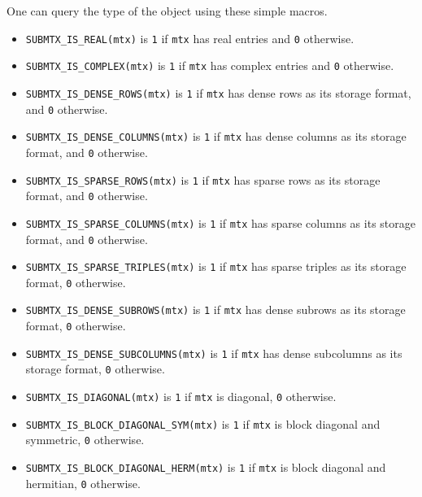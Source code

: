 \par
One can query the type of the object using these simple macros.
\begin{itemize}
\item
{\tt SUBMTX\_IS\_REAL(mtx)} is {\tt 1} if {\tt mtx} 
has real entries and {\tt 0} otherwise.
\item
{\tt SUBMTX\_IS\_COMPLEX(mtx)} is {\tt 1} if {\tt mtx} 
has complex entries and {\tt 0} otherwise.
\item
{\tt SUBMTX\_IS\_DENSE\_ROWS(mtx)} is {\tt 1} if {\tt mtx} 
has dense rows as its storage format, 
and {\tt 0} otherwise.
\item
{\tt SUBMTX\_IS\_DENSE\_COLUMNS(mtx)} is {\tt 1} if {\tt mtx} 
has dense columns as its storage format, 
and {\tt 0} otherwise.
\item
{\tt SUBMTX\_IS\_SPARSE\_ROWS(mtx)} is {\tt 1} if {\tt mtx} 
has sparse rows as its storage format, 
and {\tt 0} otherwise.
\item
{\tt SUBMTX\_IS\_SPARSE\_COLUMNS(mtx)} is {\tt 1} if {\tt mtx} 
has sparse columns as its storage format, 
and {\tt 0} otherwise.
\item
{\tt SUBMTX\_IS\_SPARSE\_TRIPLES(mtx)} is {\tt 1} if {\tt mtx} 
has sparse triples as its storage format, 
{\tt 0} otherwise.
\item
{\tt SUBMTX\_IS\_DENSE\_SUBROWS(mtx)} is {\tt 1} if {\tt mtx} 
has dense subrows as its storage format, 
{\tt 0} otherwise.
\item
{\tt SUBMTX\_IS\_DENSE\_SUBCOLUMNS(mtx)} is {\tt 1} if {\tt mtx} 
has dense subcolumns as its storage format, 
{\tt 0} otherwise.
\item
{\tt SUBMTX\_IS\_DIAGONAL(mtx)} is {\tt 1} if {\tt mtx} is diagonal, 
{\tt 0} otherwise.
\item
{\tt SUBMTX\_IS\_BLOCK\_DIAGONAL\_SYM(mtx)} is {\tt 1} if {\tt mtx} 
is block diagonal and symmetric, 
{\tt 0} otherwise.
\item
{\tt SUBMTX\_IS\_BLOCK\_DIAGONAL\_HERM(mtx)} is {\tt 1} if {\tt mtx} 
is block diagonal and hermitian, 
{\tt 0} otherwise.
\end{itemize}
